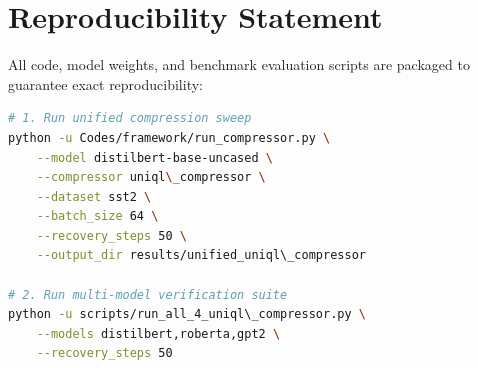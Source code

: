\section{Reproducibility Statement}
All code, model weights, and benchmark evaluation scripts are packaged to guarantee exact reproducibility:
\begin{lstlisting}[language=bash]
# 1. Run unified compression sweep
python -u Codes/framework/run_compressor.py \
    --model distilbert-base-uncased \
    --compressor uniql\_compressor \
    --dataset sst2 \
    --batch_size 64 \
    --recovery_steps 50 \
    --output_dir results/unified_uniql\_compressor

# 2. Run multi-model verification suite
python -u scripts/run_all_4_uniql\_compressor.py \
    --models distilbert,roberta,gpt2 \
    --recovery_steps 50
\end{lstlisting}
